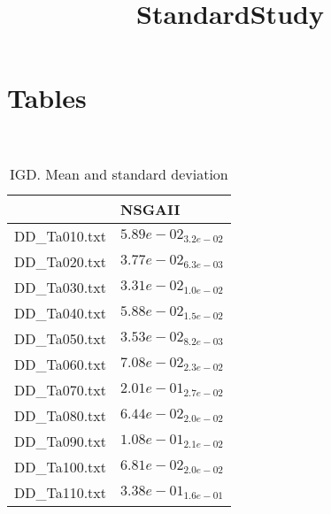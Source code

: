 \documentclass{article}
\title{StandardStudy}
\author{}
\begin{document}
\maketitle
\section{Tables}
\
\begin{table}
\caption{IGD. Mean and standard deviation}
\label{table:mean.IGD}
\centering
\begin{scriptsize}
\begin{tabular}{ll}
\hline &  NSGAII\\
\hline
DD_Ta010.txt & \cellcolor{gray95}$  5.89e-02_{ 3.2e-02}$ \\
DD_Ta020.txt & \cellcolor{gray95}$  3.77e-02_{ 6.3e-03}$ \\
DD_Ta030.txt & \cellcolor{gray95}$  3.31e-02_{ 1.0e-02}$ \\
DD_Ta040.txt & \cellcolor{gray95}$  5.88e-02_{ 1.5e-02}$ \\
DD_Ta050.txt & \cellcolor{gray95}$  3.53e-02_{ 8.2e-03}$ \\
DD_Ta060.txt & \cellcolor{gray95}$  7.08e-02_{ 2.3e-02}$ \\
DD_Ta070.txt & \cellcolor{gray95}$  2.01e-01_{ 2.7e-02}$ \\
DD_Ta080.txt & \cellcolor{gray95}$  6.44e-02_{ 2.0e-02}$ \\
DD_Ta090.txt & \cellcolor{gray95}$  1.08e-01_{ 2.1e-02}$ \\
DD_Ta100.txt & \cellcolor{gray95}$  6.81e-02_{ 2.0e-02}$ \\
DD_Ta110.txt & \cellcolor{gray95}$  3.38e-01_{ 1.6e-01}$ \\
\hline
\end{tabular}
\end{scriptsize}
\end{table}
\
\end{document}
